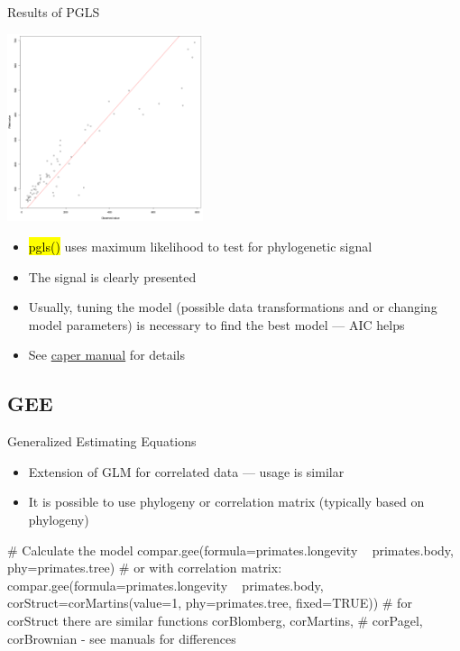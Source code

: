 \documentclass[compress, ucs, xelatex, 11pt, xcolor=svgnames,
	hyperref={
		bookmarks=true,
		unicode=true,
		colorlinks=true,
		pdftitle={Molecular data in R},
		plainpages=false,
		pdfauthor={Vojtech Zeisek},
		pdfsubject={Course about phylogeny and evolution in R},
		pdfcreator={XeLaTeX},
		pdfkeywords={R, evolution, phylogeny, molecular data},
		linkcolor=Tomato,
		anchorcolor=SaddleBrown,
		citecolor=Goldenrod,
		filecolor=DarkMagenta,
		menucolor=Sienna,
		urlcolor=DarkTurquoise,
		pdftex},
	url={hyphens, lowtilde} %
	]{beamer}
\renewcommand{\texttt}[1]{\hl{\ttfamily #1}}
\begin{document}
\begin{frame}{Results of PGLS}
	\begin{multicols}{2}
		\includegraphics[height=5.5cm]{shorebirds.png}
		\begin{itemize}
			\item \texttt{pgls()} uses maximum likelihood to test for phylogenetic signal
			\item The signal is clearly presented
			\item Usually, tuning the model (possible data transformations and or changing model parameters) is necessary to find the best model --- AIC helps
			\item See \href{https://CRAN.R-project.org/package=caper}{caper manual} for details
		\end{itemize}
	\end{multicols}
\end{frame}

\subsection{GEE}

\begin{frame}[fragile]{Generalized Estimating Equations}
	\begin{itemize}
		\item Extension of GLM for correlated data --- usage is similar
		\item It is possible to use phylogeny or correlation matrix (typically based on phylogeny)
	\end{itemize}
	\vfil
	\begin{spluscode}
    # Calculate the model
    compar.gee(formula=primates.longevity ~ primates.body,
      phy=primates.tree)
    # or with correlation matrix:
    compar.gee(formula=primates.longevity ~ primates.body,
      corStruct=corMartins(value=1, phy=primates.tree, fixed=TRUE))
    # for corStruct there are similar functions corBlomberg, corMartins,
    # corPagel, corBrownian - see manuals for differences
	\end{spluscode}
\end{frame}
\end{document}
